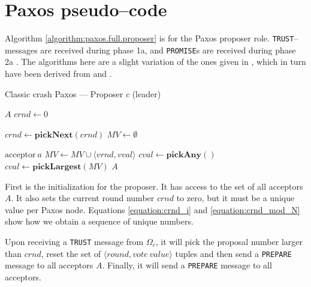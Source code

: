 \section{Paxos pseudo--code}

Algorithm \ref{algorithm:paxos.full.proposer} is for the Paxos proposer
role.  \texttt{TRUST}--messages are received during phase 1a, and
\texttt{PROMISE}s are received during phase 2a \cite{Lam01}.  The algorithms
here are a slight variation of the ones given in \cite{Insane.Paxos}, which
in turn have been derived from \cite{renesse.paxos} and \cite{Lam01}.

\begin{algorithm}
  \caption{Classic crash Paxos --- Proposer $c$ (leader)}
  \label{algorithm:paxos.full.proposer}
  \begin{algorithmic}

    \State $A$ 
    \State $crnd \gets 0$ 
    \State

      \State $crnd \gets \textbf{pickNext}(crnd)$ 
      \State $MV \gets \emptyset$ 
      \State {}
    \EndOn
    \State

       {$\text{acceptor}\ a$} 
        \State $MV \gets MV \cup \langle vrnd, vval \rangle$
            \State $cval \gets \textbf{pickAny}()$
          \Else
            \State $cval \gets \textbf{pickLargest}(MV)$
          \EndIf
         \State {}
                       {$A$}
        \EndIf
      \EndIf
    \EndOn

  \end{algorithmic}
\end{algorithm}

First is the initialization for the proposer. It has access to the set of
all acceptors $A$.  It also sets the current round number $crnd$ to
zero, but it must be a unique value per Paxos node.
Equations \ref{equation:crnd_i} and \ref{equation:crnd_mod_N} show how we
obtain a sequence of unique numbers.

Upon receiving a \texttt{TRUST} message from $\Omega_c$, it will pick the
proposal number larger than $crnd$, reset the set of
$\langle round, vote~value\rangle$ tuples and then send a
\texttt{PREPARE} message to all acceptors $A$.  Finally, it will
send a \texttt{PREPARE} message to all acceptors.


